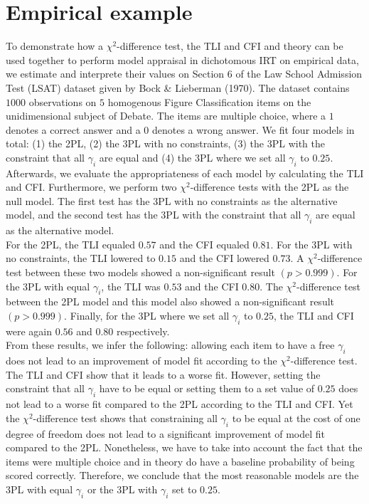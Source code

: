 \documentclass[Royal,sageapa,times,doublespace]{sagej}
\begin{document}
\section{\centering Empirical example}
To demonstrate how a $\chi^2$-difference test, the TLI and CFI and theory can be used together to perform model appraisal in dichotomous IRT on empirical data, we estimate and interprete their values on Section 6 of the Law School Admission Test (LSAT) dataset given by Bock \& Lieberman (1970). The dataset contains $1000$ observations on $5$ homogenous Figure Classification items on the unidimensional subject of Debate. The items are multiple choice, where a $1$ denotes a correct answer and a $0$ denotes a wrong answer. We fit four models in total: (1) the 2PL, (2) the 3PL with no constraints, (3) the 3PL with the constraint that all $\gamma_i$ are equal and (4) the 3PL where we set all $\gamma_i$ to $0.25$. Afterwards, we evaluate the appropriateness of each model by calculating the TLI and CFI. Furthermore, we perform two $\chi^2$-difference tests with the 2PL as the null model. The first test has the 3PL with no constraints as the alternative model, and the second test has the 3PL with the constraint that all $\gamma_i$ are equal as the alternative model. \\
\indent For the 2PL, the TLI equaled $0.57$ and the CFI equaled $0.81$. For the 3PL with no constraints, the TLI lowered to $0.15$ and the CFI lowered $0.73$. A $\chi^2$-difference test between these two models showed a non-significant result $(p > 0.999)$. For the 3PL with equal $\gamma_i$, the TLI was $0.53$ and the CFI $0.80$. The $\chi^2$-difference test between the 2PL model and this model also showed a non-significant result $(p > 0.999)$. Finally, for the 3PL where we set all $\gamma_i$ to $0.25$, the TLI and CFI were again $0.56$ and $0.80$ respectively. \\
\indent From these results, we infer the following: allowing each item to have a free $\gamma_i$ does not lead to an improvement of model fit according to the $\chi^2$-difference test. The TLI and CFI show that it leads to a worse fit. However, setting the constraint that all $\gamma_i$ have to be equal or setting them to a set value of $0.25$ does not lead to a worse fit compared to the 2PL according to the TLI and CFI. Yet the $\chi^2$-difference test shows that constraining all $\gamma_i$ to be equal at the cost of one degree of freedom does not lead to a significant improvement of model fit compared to the 2PL. Nonetheless, we have to take into account the fact that the items were multiple choice and in theory do have a baseline probability of being scored correctly. Therefore, we conclude that the most reasonable models are the 3PL with equal $\gamma_i$ or the 3PL with $\gamma_i$ set to $0.25$.
\end{document}
